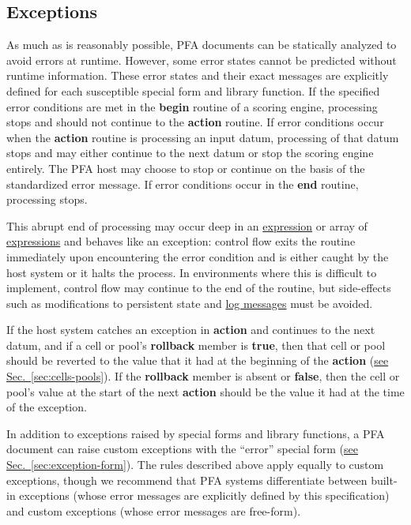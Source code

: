 \documentclass{article}
\newcommand{\PFAc}{\ttfamily\bfseries}
\theoremstyle{definition}
\begin{document}
\subsection{Exceptions}
\label{sec:exceptions}

As much as is reasonably possible, PFA documents can be statically analyzed to avoid errors at runtime.  However, some error states cannot be predicted without runtime information.  These error states and their exact messages are explicitly defined for each susceptible special form and library function.  If the specified error conditions are met in the {\PFAc begin} routine of a scoring engine, processing stops and should not continue to the {\PFAc action} routine.  If error conditions occur when the {\PFAc action} routine is processing an input datum, processing of that datum stops and may either continue to the next datum or stop the scoring engine entirely.  The PFA host may choose to stop or continue on the basis of the standardized error message.  If error conditions occur in the {\PFAc end} routine, processing stops.

This abrupt end of processing may occur deep in an \hyperlink{hsec:expressions}{expression} or array of \hyperlink{hsec:expressions}{expressions} and behaves like an exception: control flow exits the routine immediately upon encountering the error condition and is either caught by the host system or it halts the process.  In environments where this is difficult to implement, control flow may continue to the end of the routine, but side-effects such as modifications to persistent state and \hyperlink{hsec:logs}{log messages} must be avoided.

If the host system catches an exception in {\PFAc action} and continues to the next datum, and if a cell or pool's {\PFAc rollback} member is {\PFAc true}, then that cell or pool should be reverted to the value that it had at the beginning of the {\PFAc action} (\hyperlink{hsec:cells-pools}{see Sec.~\ref{sec:cells-pools}}).  If the {\PFAc rollback} member is absent or {\PFAc false}, then the cell or pool's value at the start of the next {\PFAc action} should be the value it had at the time of the exception.

In addition to exceptions raised by special forms and library functions, a PFA document can raise custom exceptions with the ``error'' special form (\hyperlink{hsec:exception-form}{see Sec.~\ref{sec:exception-form}}).  The rules described above apply equally to custom exceptions, though we recommend that PFA systems differentiate between built-in exceptions (whose error messages are explicitly defined by this specification) and custom exceptions (whose error messages are free-form).
\end{document}
